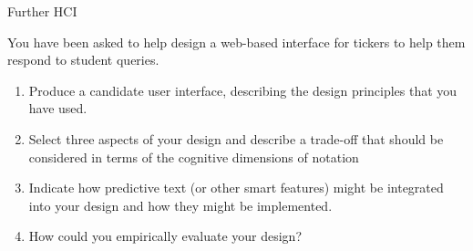 \documentclass{tripos}  %
\begin{document}
\begin{question}[MockIB,year=2024,paper=2,question=10,author=rrw]{Further HCI}


You have been asked to help design a web-based interface for tickers to help them respond to student queries.

\begin{enumerate}
\item Produce a candidate user interface, describing the design principles that you have used. 
\item Select three aspects of your design and describe a trade-off that should be considered in terms of the cognitive dimensions of notation 
\item Indicate how predictive text (or other smart features) might be integrated into your design and how they might be implemented. 
\item How could you empirically evaluate your design? 
\end{enumerate}

\end{question}
\end{document}

